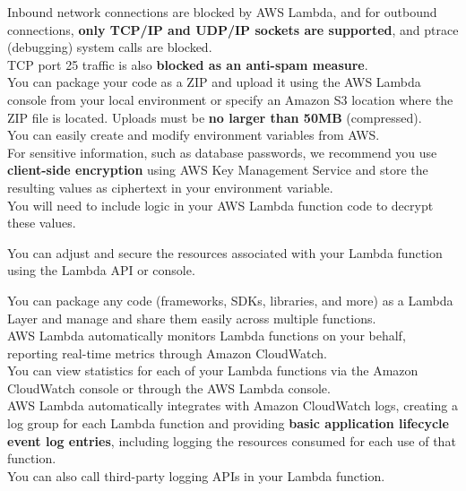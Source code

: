 \documentclass[12pt, letterpaper, twoside]{article}
\begin{document}
Inbound network connections are blocked by AWS Lambda, and for outbound connections, \textbf{only TCP/IP and UDP/IP sockets are 
supported}, and ptrace (debugging) system calls are blocked.\\
TCP port 25 traffic is also \textbf{blocked as an anti-spam measure}.\\

You can package your code as a ZIP and upload it using the AWS Lambda console from your local environment or specify an Amazon S3 
location where the ZIP file is located. Uploads must be \textbf{no larger than 50MB} (compressed).\\

You can easily create and modify environment variables from AWS.\\
For sensitive information, such as database passwords, we recommend you use \textbf{client-side encryption} using AWS Key Management 
Service and store the resulting values as ciphertext in your environment variable.\\
You will need to include logic in your AWS Lambda function code to decrypt these values.\\

\begin{tcolorbox}[colback=blue!5!white,colframe=blue!75!black,title=Important]
You can adjust and secure the resources associated with your Lambda function using the Lambda API or console.
\end{tcolorbox}

You can package any code (frameworks, SDKs, libraries, and more) as a Lambda Layer and manage and share them easily across 
multiple functions.\\

AWS Lambda automatically monitors Lambda functions on your behalf, reporting real-time metrics through Amazon CloudWatch.\\
You can view statistics for each of your Lambda functions via the Amazon CloudWatch console or through the AWS Lambda 
console.\\

AWS Lambda automatically integrates with Amazon CloudWatch logs, creating a log group for each Lambda function and 
providing \textbf{basic application lifecycle event log entries}, including logging the resources consumed for each use of that 
function.\\
You can also call third-party logging APIs in your Lambda function.\\
\end{document}
